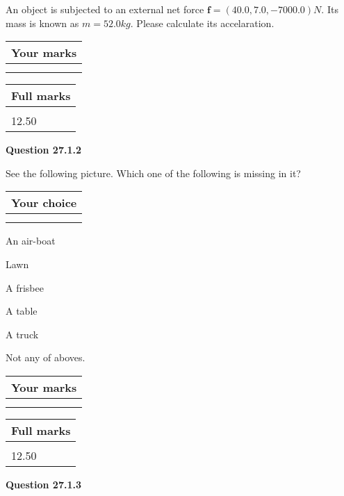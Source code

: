 \documentclass[12pt]{article}
\begin{document}
  
 
An object is subjected to an external net force $\mathbf{f}=(
40.0,  %
7.0,
-7000.0  )N$. Its mass is known as
$m= %
52.0 kg$. Please calculate its accelaration.
 
 

 

 
\vspace{0.3in}
  
\vspace{0.2in}
  
         \begin{tabular}{|l|}
\hline
 Your marks  \\
\hline
 \\ 
 \\ 
\hline
\end{tabular}
\hspace{0.05in} \begin{tabular}{|l|}
\hline
 Full marks  \\
\hline
 \\ 
12.50 \\
\hline
\end{tabular}
{\textbf{\Large{Question
27.1.2 
}}}
  
  
See the following picture.
Which one of the following is missing in it?
  
  
\noindent\hspace{3.0in} \begin{tabular}{|l|}
\hline
Your choice \\
\hline
 \\ 
 \\ 
\hline
\end{tabular}
  
  
 
 
An air-boat
 
 
Lawn
 
 
A frisbee
 
 
A table
 
 
A truck
 
 
  Not any of aboves.
 
 
 
\vspace{0.3in}
  
\vspace{0.2in}
  
         \begin{tabular}{|l|}
\hline
 Your marks  \\
\hline
 \\ 
 \\ 
\hline
\end{tabular}
\hspace{0.05in} \begin{tabular}{|l|}
\hline
 Full marks  \\
\hline
 \\ 
12.50 \\
\hline
\end{tabular}
{\textbf{\Large{Question
27.1.3 
}}}
  
\end{document}
